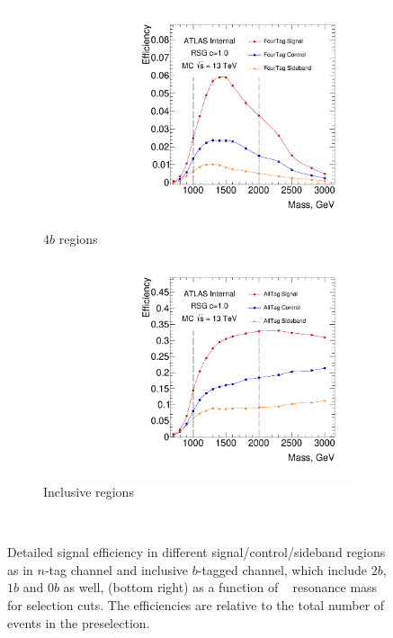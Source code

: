 \begin{figure}[htbp!]
    \begin{subfigure}[b]{0.4\textwidth}
        \includegraphics[width=\textwidth,angle=-90]{figures/boosted/SigEff/region_4b_lst_Moriond_Efficiency_PreSel.pdf}
        \caption{$4b$ regions}
        \label{fig:4b-selection-region-efficiency}
    \end{subfigure}
    \quad \quad 
    \begin{subfigure}[b]{0.4\textwidth}
        \includegraphics[width=\textwidth,angle=-90]{figures/boosted/SigEff/region_alltag_lst_Moriond_Efficiency_PreSel.pdf}
        \caption{Inclusive regions}
        \label{fig:alltag-selection-region-efficiency}
    \end{subfigure} \\ 
   \caption{
   Detailed signal efficiency in different signal/control/sideband regions as in $n$-tag channel and inclusive $b$-tagged channel, which include $2b$, $1b$ and 0$b$ as well, (bottom right) as a function of \Grav~ resonance mass for selection cuts. The efficiencies are relative to the total number of events in the preselection.}
  \label{fig:boosted-selection-region-efficiency}
\end{figure}


